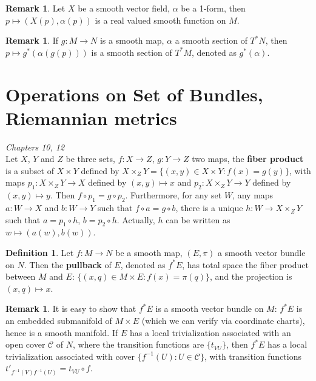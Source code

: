 \documentclass{article}
\theoremstyle{definition}
\newtheorem{dfn}[thm]{Definition}
\newtheorem{rmk}[thm]{Remark}
\begin{document}
\begin{rmk}
    Let $X$ be a smooth vector field, $\alpha$ be a 1-form, then $p\mapsto (X(p), \alpha(p))$ is a real valued smooth function on $M$. 
\end{rmk}

\begin{rmk}
    If $g: M\rightarrow N$ is a smooth map, $\alpha$ a smooth section of $T^*N$, then $p\mapsto g^*(\alpha(g(p)))$ is a smooth section of $T^*M$, denoted as $g^*(\alpha)$.
\end{rmk}


\newpage

\section{Operations on Set of Bundles, Riemannian metrics}

{\em Chapters 10, 12}\\

Let $X$, $Y$ and $Z$ be three sets, $f: X\rightarrow Z$, $g: Y\rightarrow Z$ two maps, the {\bf fiber product} is a subset of $X\times Y$ defined by $X\times_Z Y=\{(x, y)\in X\times Y: f(x)=g(y)\}$, with maps $p_1: X\times_Z Y\rightarrow X$ defined by $(x, y)\mapsto x$ and $p_2: X\times_Z Y\rightarrow Y$ defined by $(x, y)\mapsto y$. Then $f\circ p_1=g\circ p_2$. Furthermore, for any set $W$, any maps $a: W\rightarrow X$ and $b: W\rightarrow Y$ such that $f\circ a=g\circ b$, there is a unique $h: W\rightarrow X\times_Z Y$ such that $a=p_1\circ h$, $b=p_2\circ h$. Actually, $h$ can be written as $w\mapsto (a(w), b(w))$.

\begin{dfn}\label{pullback}
Let $f: M\rightarrow N$ be a smooth map, $(E, \pi)$ a smooth vector bundle on $N$. Then the {\bf pullback} of $E$, denoted as $f^*E$, has total space the fiber product between $M$ and $E$: $\{(x, q)\in M\times E: f(x)=\pi(q)\}$, and the projection is $(x, q)\mapsto x$.
\end{dfn}

\begin{rmk}
    It is easy to show that $f^*E$ is a smooth vector bundle on $M$: $f^*E$ is an embedded submanifold of $M\times E$ (which we can verify via coordinate charts), hence is a smooth manifold. If $E$ has a local trivialization associated with an open cover $\mathcal{C}$ of $N$, where the transition functions are $\{t_{VU}\}$, then $f^*E$ has a local trivialization associated with cover $\{f^{-1}(U): U\in\mathcal{C}\}$, with transition functions $t'_{f^{-1}(V)f^{-1}(U)}=t_{VU}\circ f$.
\end{rmk}
\end{document}
